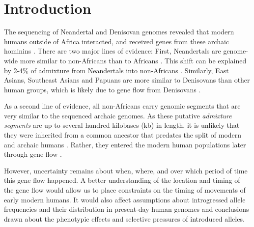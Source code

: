 \documentclass[]{article}
\let\oldparagraph\paragraph
\renewcommand{\paragraph}[1]{\oldparagraph{#1}\mbox{}}
\begin{document}
\section{Introduction}\label{introduction}

The sequencing of Neandertal  \citep{green_draft_2010,prufer_complete_2013,prufer_high-coverage_2017, mafessoni_high_coverage_2020} and Denisovan genomes \citep{reich_genetic_2010, meyer_high-coverage_2012} revealed that modern humans outside of Africa interacted, and received genes from these archaic hominins \citep{vernot_resurrecting_2014,fu_genome_2014,sankararaman_genomic_2014,fu_early_2015,malaspinas_genomic_2016,sankararaman_combined_2016,vernot_excavating_2016}. There are two major lines of evidence: First, Neandertals are genome-wide more similar to non-Africans than to Africans \citep{green_draft_2010}. This shift can be explained by 2-4\% of admixture from Neandertals into non-Africans \citep{green_draft_2010, prufer_complete_2013}. Similarly, East Asians, Southeast Asians and Papuans are more similar to Denisovans than other human groups, which is likely due to gene flow from Denisovans \citep{meyer_high-coverage_2012}. 

As a second line of evidence, all non-Africans carry genomic segments that are very similar to the sequenced archaic genomes. As these putative \emph{admixture segments} are up to several hundred kilobases (kb) in length, it is unlikely that they were inherited from a common ancestor that predates the split of modern and archaic humans \citep{sankararaman_genomic_2014, vernot_resurrecting_2014}. Rather, they entered the modern human populations later through gene flow \citep{sankararaman_date_2012,sankararaman_genomic_2014, vernot_resurrecting_2014, sankararaman_combined_2016,vernot_excavating_2016}. 


However, uncertainty remains about when, where, and over which period of time this gene flow happened. A better understanding of  the location and timing of the gene flow would allow us to place  constraints on the timing of movements of early modern humans. It would also affect assumptions about introgressed allele frequencies and their distribution in present-day human genomes and conclusions drawn about the phenotypic effects and selective pressures of introduced alleles.
\end{document}
